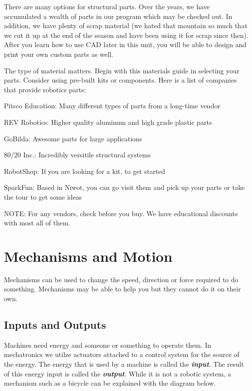 \documentclass[
]{book}
\begin{document}
There are many options for structural parts. Over the years, we have accumulated a wealth of parts in our program which may be checked out. In addition, we have plenty of scrap material (we hated that mountain so much that we cut it up at the end of the season and have been using it for scrap since then). After you learn how to use CAD later in this unit, you will be able to design and print your own custom parts as well.

The type of material matters. Begin with this materials guide in selecting your parts. Consider using pre-built kits or components. Here is a list of companies that provide robotics parts:

Pitsco Education: Many different types of parts from a long-time vendor

REV Robotics: Higher quality aluminum and high grade plastic parts

GoBilda: Awesome parts for large applications

80/20 Inc.: Incredibly versitile structural systems

RobotShop: If you are looking for a kit, to get started

SparkFun: Based in Niwot, you can go visit them and pick up your parts or take the tour to get some ideas

NOTE: For any vendors, check before you buy. We have educational discounts with most all of them.

\hypertarget{mechanisms-and-motion}{%
\section{Mechanisms and Motion}\label{mechanisms-and-motion}}

Mechanisms can be used to change the speed, direction or force required to do something. Mechanisms may be able to help you but they cannot do it on their own.

\hypertarget{inputs-and-outputs}{%
\subsection{Inputs and Outputs}\label{inputs-and-outputs}}

Machines need energy and someone or something to operate them. In mechatronics we utilze actuators attached to a control system for the source of the energy. The energy that is used by a machine is called the \textbf{\emph{input}}. The result of this energy input is called the \textbf{\emph{output}}. While it is not a robotic system, a mechanism such as a bicycle can be explained with the diagram below.
\end{document}
